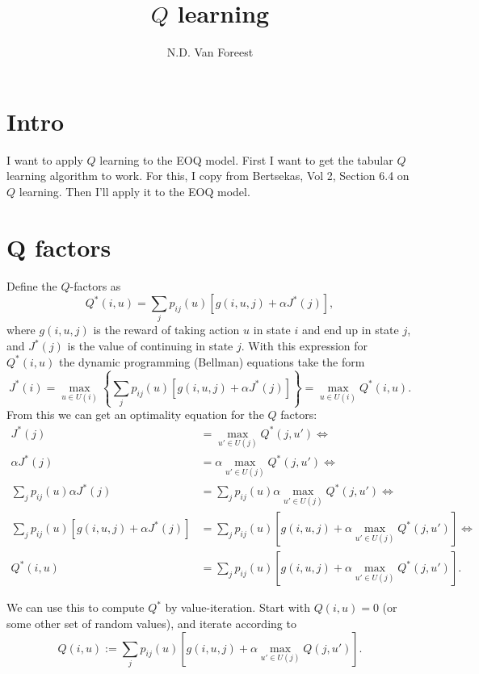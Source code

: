 \documentclass{article}
\title{$Q$ learning}
\author{N.D. Van Foreest}
\begin{document}
\maketitle

\tableofcontents

\section{Intro}
\label{sec:intro}



I want to apply $Q$ learning to the EOQ model. First I want to get
the tabular $Q$ learning algorithm to work.  For this,  I copy from
Bertsekas, Vol 2, Section 6.4 on $Q$ learning.  Then I'll apply it to the EOQ model.


\section{Q factors}
\label{sec:q-factors}


Define the $Q$-factors
as
\begin{equation*}
  Q^*(i,u) = \sum_{j} p_{ij}(u)\left[g(i,u, j) + \alpha J^*(j)\right],
\end{equation*}
where $g(i, u, j)$ is the reward of taking action $u$ in state $i$ and end up in state $j$, and $J^*(j)$ is the value of continuing in state $j$. 
With this expression for $Q^*(i,u)$ the dynamic programming (Bellman) equations take the form
\begin{equation*}
  J^*(i) 
= \max_{u\in U(i)}\left\{\sum_{j} p_{ij}(u)\left[g(i,u, j) + \alpha J^*(j)\right]\right\}
= \max_{u\in U(i)} Q^*(i,u).
\end{equation*}
From this we can get an optimality equation for  the $Q$ factors:
\begin{align*}
  J^*(j) &= \max_{u'\in U(j)} Q^*(j,u') \iff \\
\alpha J^*(j) &=   \alpha \max_{u'\in U(j)} Q^*(j,u') \iff \\
  \sum_{j} p_{ij}(u) \alpha J^*(j) &=   \sum_{j} p_{ij}(u) \alpha \max_{u'\in U(j)} Q^*(j,u') \iff \\
  \sum_{j} p_{ij}(u)\left[g(i,u,j) +  \alpha J^*(j)\right] &=   \sum_{j} p_{ij}(u) \left[g(i,u,j) + \alpha \max_{u'\in U(j)} Q^*(j,u')\right] \iff \\
  Q^*(i,u) &=   \sum_{j} p_{ij}(u) \left[g(i,u,j) + \alpha \max_{u'\in U(j)} Q^*(j,u')\right].
\end{align*}

We can use this to compute $Q^*$ by value-iteration.  Start with
$Q(i,u)=0$ (or some other set of random values), and iterate according to
\begin{equation}\label{eq:1}
  Q(i,u) :=   \sum_{j} p_{ij}(u) \left[g(i,u,j) + \alpha \max_{u'\in U(j)} Q(j,u')\right].
\end{equation}
\end{document}
